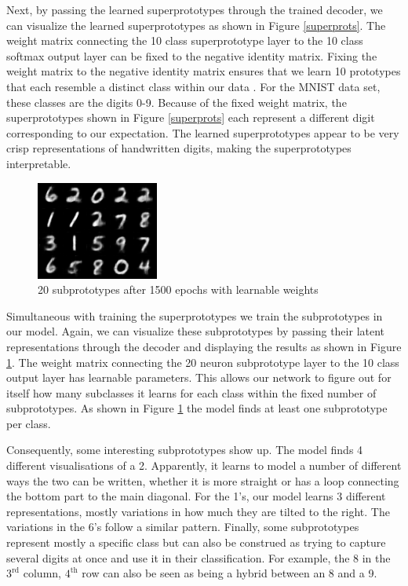 Next, by passing the learned superprototypes through the trained decoder, we can visualize the learned superprototypes as shown in Figure \ref{superprots}. The weight matrix connecting the 10 class superprototype layer to the 10 class softmax output layer can be fixed to the negative identity matrix. Fixing the weight matrix to the negative identity matrix ensures that we learn 10 prototypes that each resemble a distinct class within our data \cite{li2018deep}. For the MNIST data set, these classes are the digits 0-9. Because of the fixed weight matrix, the superprototypes shown in Figure \ref{superprots} each represent a different digit corresponding to our expectation. The learned superprototypes appear to be very crisp representations of handwritten digits, making the superprototypes interpretable.
\begin{figure}[ht]
    \centering
    \includegraphics{img/subprot1499.png}
    \caption{20 subprototypes after 1500 epochs with learnable weights}
    \label{subprots}
\end{figure}

Simultaneous with training the superprototypes we train the subprototypes in our model. Again, we can visualize these subprototypes by passing their latent representations through the decoder and displaying the results as shown in Figure \ref{subprots}. The weight matrix connecting the 20 neuron subprototype layer to the 10 class output layer has learnable parameters. This allows our network to figure out for itself how many subclasses it learns for each class within the fixed number of subprototypes. As shown in Figure \ref{subprots} the model finds at least one subprototype per class. 

Consequently, some interesting subprototypes show up. The model finds 4 different visualisations of a 2. Apparently, it learns to model a number of different ways the two can be written, whether it is more straight or has a loop connecting the bottom part to the main diagonal. For the 1's, our model learns 3 different representations, mostly variations in how much they are tilted to the right. The variations in the 6's follow a similar pattern. Finally, some subprototypes represent mostly a specific class but can also be construed as trying to capture several digits at once and use it in their classification. For example, the 8 in the $3^{\text{rd}}$ column, $4^{\text{th}}$ row can also be seen as being a hybrid between an 8 and a 9. 
